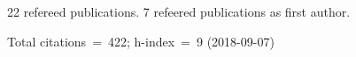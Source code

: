 22 refereed publications. 7 refeered publications as first author.

               Total citations~=~422; h-index~=~9 (2018-09-07)